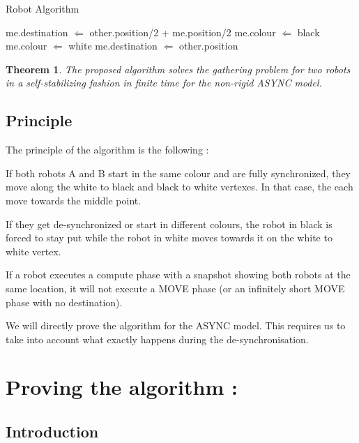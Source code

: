 \documentclass[11pt]{article}
\newtheorem{Theorem}{Theorem}
\begin{document}
\begin{algorithm}
\caption{Robot Algorithm}         
\label{alg1}                           
\begin{algorithmic}                    
    \STATE 
        \STATE me.destination $\Leftarrow$ other.position/2 + me.position/2
        \STATE me.colour $\Leftarrow$ black
        \STATE me.colour $\Leftarrow$ white
        \STATE me.destination $\Leftarrow$ other.position
    \ENDIF
\end{algorithmic}
\end{algorithm}


\begin{Theorem}
The proposed algorithm solves the gathering problem for two robots in a self-stabilizing fashion in finite time for the non-rigid ASYNC model.
\end{Theorem}

\subsection{Principle}

The principle of the algorithm is the following :

If both robots A and B start in the same colour and are fully synchronized, they move along the white to black and black to white vertexes. In that case, the each move towards the middle point.

If they get de-synchronized or start in different colours, the robot in black is forced to stay put while the robot in white moves towards it on the white to white vertex.

If a robot executes a compute phase with a snapshot showing both robots at the same location, it will not execute a MOVE phase (or an infinitely short MOVE phase with no destination).

We will directly prove the algorithm for the ASYNC model. 
This requires us to take into account what exactly happens during the de-synchronisation.


\section{Proving the algorithm :}

\subsection{Introduction}
\end{document}
